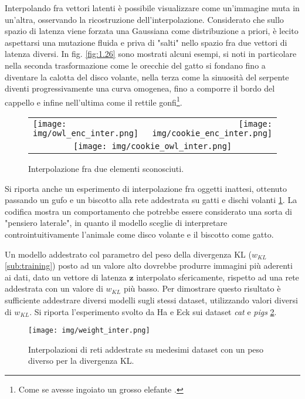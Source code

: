 Interpolando fra vettori latenti è possibile visualizzare come un'immagine muta in un'altra, osservando la ricostruzione dell'interpolazione. Considerato che sullo spazio di latenza viene forzata una Gaussiana come distribuzione a priori, è lecito aspettarsi una mutazione fluida e priva di "salti" nello spazio fra due vettori di latenza diversi. In fig. \ref{fig:1.26} sono mostrati alcuni esempi, si noti in particolare nella seconda trasformazione come le orecchie del gatto si fondano fino a diventare la calotta del disco volante, nella terza come la sinuosità del serpente diventi progressivamente una curva omogenea, fino a comporre il bordo del cappello e infine nell'ultima come il rettile gonfi\footnote{Come se avesse ingoiato un grosso elefante \cite{petitprince}.}.

\begin{figure}[ht]
	\centering
	\begin{tabular}{lr}
		\texttt{[image: img/owl\_enc\_inter.png]} &
		\texttt{[image: img/cookie\_enc\_inter.png]} \\
		\multicolumn{2}{c}{\texttt{[image: img/cookie\_owl\_inter.png]}}
	\end{tabular}
	\caption{Interpolazione fra due elementi sconosciuti.}
	\label{fig:1.29}
\end{figure}

Si riporta anche un esperimento di interpolazione fra oggetti inattesi, ottenuto passando un gufo e un biscotto alla rete addestrata su gatti e dischi volanti \ref{fig:1.29}. La codifica mostra un comportamento che potrebbe essere considerato una sorta di "pensiero laterale", in quanto il modello sceglie di interpretare controintuitivamente l'animale come disco volante e il biscotto come gatto.

Un modello addestrato col parametro del peso della divergenza KL ($w_{KL}$ \ref{sub:training}) posto ad un valore alto dovrebbe produrre immagini più aderenti ai dati, dato un vettore di latenza $\boldsymbol{z}$ interpolato sfericamente, rispetto ad una rete addestrata con un valore di $w_{KL}$ più basso. Per dimostrare questo risultato è sufficiente addestrare diversi modelli sugli stessi dataset, utilizzando valori diversi di $w_{KL}$. Si riporta l'esperimento svolto da Ha e Eck sui dataset \textit{cat} e \textit{pigs} \ref{fig:1.27}.
\begin{figure}
	\centering
	\texttt{[image: img/weight\_inter.png]}
	\caption{Interpolazioni di reti addestrate su medesimi dataset con un peso diverso per la divergenza KL.}
	\label{fig:1.27}
\end{figure}
